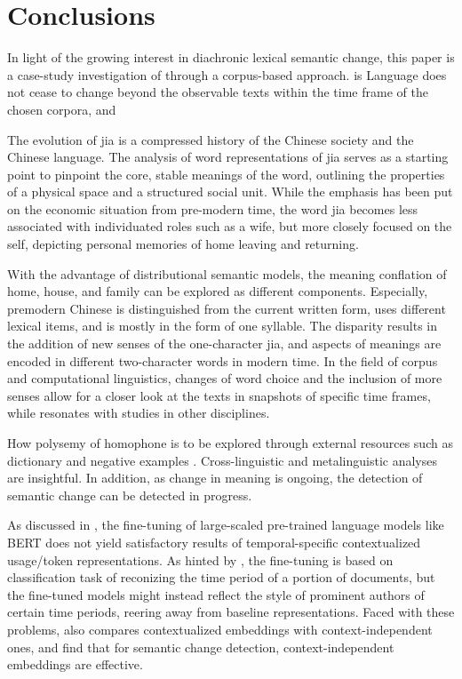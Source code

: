 

\chapter{Conclusions}
In light of the growing interest in diachronic lexical semantic change, this paper is a case-study investigation of \jia through a corpus-based approach. is Language does not cease to change beyond the observable texts within the time frame of the chosen corpora, and  

The evolution of jia is a compressed history of the Chinese society and the Chinese language. The analysis of word representations of jia serves as a starting point to pinpoint the core, stable meanings of the word, outlining the properties of a physical space and a structured social unit. While the emphasis has been put on the economic situation from pre-modern time, the word jia becomes less associated with individuated roles such as a wife, but more closely focused on the self, depicting personal memories of home leaving and returning. 

With the advantage of distributional semantic models, the meaning conflation of home, house, and family can be explored as different components. Especially, premodern Chinese is distinguished from the current written form, uses different lexical items, and is mostly in the form of one syllable. The disparity results in the addition of new senses of the one-character jia, and aspects of meanings are encoded in different two-character words in modern time. In the field of corpus and computational linguistics, changes of word choice and the inclusion of more senses allow for a closer look at the texts in snapshots of specific time frames, while resonates with studies in other disciplines.

How polysemy of homophone is to be explored through external resources such as dictionary and negative examples \textcite[15]{traugott2001regularity}.  Cross-linguistic and metalinguistic analyses are insightful. In addition, as change in meaning is ongoing, the detection of semantic change can be detected in progress.

As discussed in \textcite{giulianelli2019lexical}, the fine-tuning of large-scaled pre-trained language models like BERT does not yield satisfactory results of temporal-specific contextualized usage/token representations. As hinted by \textcite{giulianelli2019lexical}, the fine-tuning is based on classification task of reconizing the time period of a portion of documents, but the fine-tuned models might instead reflect the style of prominent authors of certain time periods, reering away from baseline representations. Faced with these problems, \textcite{kutuzov2020uio} also compares contextualized embeddings with context-independent ones, and find that for semantic change detection, context-independent embeddings are effective.

